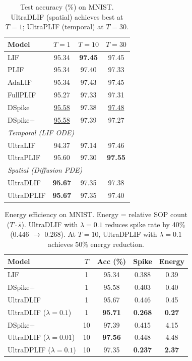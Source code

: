 \documentclass{article}
\theoremstyle{plain}
\theoremstyle{definition}
\theoremstyle{remark}
\begin{document}
\begin{table}[t]
\caption{Test accuracy (\%) on MNIST. UltraDLIF (spatial) achieves best at $T{=}1$; UltraPLIF (temporal) at $T{=}30$.}
\label{tab:mnist}
\vskip 0.1in
\begin{center}
\begin{small}
\begin{tabular}{lccc}
\toprule
Model & $T{=}1$ & $T{=}10$ & $T{=}30$ \\
\midrule
LIF        & 95.34 & \textbf{97.45} & 97.45 \\
PLIF       & 95.34 & 97.40 & 97.33 \\
AdaLIF     & 95.34 & 97.43 & 97.45 \\
FullPLIF   & 95.27 & 97.33 & 97.31 \\
DSpike     & \underline{95.58} & 97.38 & \underline{97.48} \\
DSpike+    & \underline{95.58} & 97.39 & 97.27 \\
\midrule
\multicolumn{4}{l}{\textit{Temporal (LIF ODE)}} \\
UltraLIF   & 94.37 & 97.14 & 97.46 \\
UltraPLIF  & 95.60 & 97.30 & \textbf{97.55} \\
\midrule
\multicolumn{4}{l}{\textit{Spatial (Diffusion PDE)}} \\
UltraDLIF  & \textbf{95.67} & 97.35 & 97.38 \\
UltraDPLIF & \textbf{95.67} & 97.35 & 97.40 \\
\bottomrule
\end{tabular}
\end{small}
\end{center}
\vskip -0.1in
\end{table}

\begin{table}[t]
\caption{Energy efficiency on MNIST. Energy = relative SOP count ($T \cdot \bar{s}$). UltraDLIF with $\lambda{=}0.1$ reduces spike rate by 40\% (0.446 $\to$ 0.268). At $T{=}10$, UltraDPLIF with $\lambda{=}0.1$ achieves 50\% energy reduction.}
\label{tab:mnist_efficiency}
\vskip 0.1in
\begin{center}
\begin{small}
\begin{tabular}{lcccc}
\toprule
Model & $T$ & Acc (\%) & Spike & Energy \\
\midrule
LIF        & 1 & 95.34 & 0.388 & 0.39 \\
DSpike+    & 1 & 95.58 & 0.403 & 0.40 \\
UltraDLIF   & 1 & 95.67 & 0.446 & 0.45 \\
UltraDLIF ($\lambda{=}0.1$) & 1 & \textbf{95.71} & \textbf{0.268} & \textbf{0.27} \\
\midrule
DSpike+    & 10 & 97.39 & 0.415 & 4.15 \\
UltraDLIF ($\lambda{=}0.01$) & 10 & \textbf{97.56} & 0.448 & 4.48 \\
UltraDPLIF ($\lambda{=}0.1$) & 10 & 97.35 & \textbf{0.237} & \textbf{2.37} \\
\bottomrule
\end{tabular}
\end{small}
\end{center}
\vskip -0.1in
\end{table}
\end{document}
